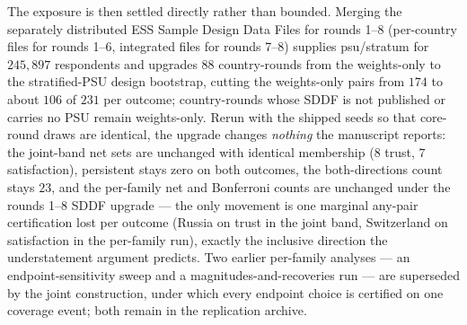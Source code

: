 \documentclass[12pt]{article}
\theoremstyle{definition}
\theoremstyle{remark}
\begin{document}
The exposure is then settled directly rather than bounded.
Merging the separately distributed ESS Sample Design Data Files for rounds
1--8 (per-country files for rounds 1--6,
integrated files for rounds 7--8) supplies psu/stratum for $245{,}897$
respondents and upgrades $88$ country-rounds from the weights-only to the
stratified-PSU design bootstrap, cutting the weights-only pairs from $174$ to
about $106$ of $231$ per outcome; country-rounds whose SDDF is not published
or carries no PSU remain weights-only. Rerun with the shipped seeds so that
core-round draws are identical, the upgrade changes \emph{nothing} the
manuscript reports: the joint-band net sets are unchanged with identical
membership ($8$ trust, $7$ satisfaction), persistent stays zero on both
outcomes, the both-directions count stays $23$, and the per-family net and
Bonferroni counts are unchanged under the rounds 1--8 SDDF upgrade --- the
only movement is one marginal any-pair certification lost per outcome (Russia
on trust in the joint band, Switzerland on satisfaction in the per-family
run), exactly the inclusive direction the understatement argument predicts.
Two earlier per-family analyses --- an endpoint-sensitivity sweep and a magnitudes-and-recoveries run --- are
superseded by the joint construction, under which every endpoint choice is
certified on one coverage event; both remain in the replication archive.
\end{document}
